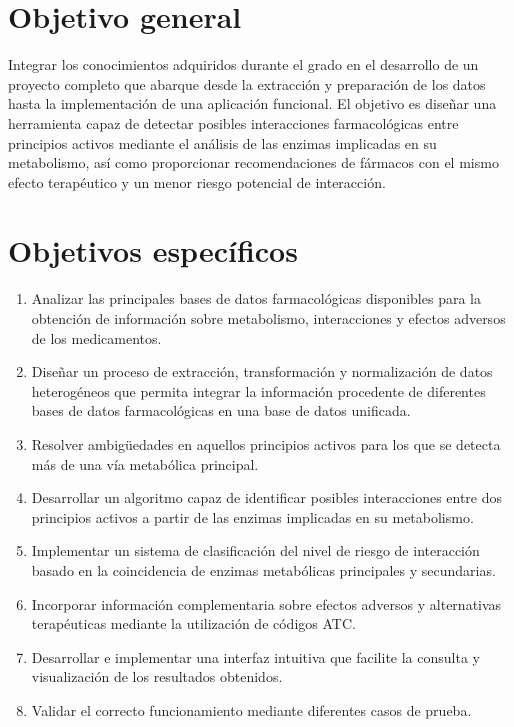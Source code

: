 
\section{Objetivo general}
Integrar los conocimientos adquiridos durante el grado en el desarrollo de un proyecto completo 
que abarque desde la extracción y preparación de los datos hasta la implementación de una  
aplicación funcional. El objetivo es diseñar una herramienta capaz de detectar posibles interacciones farmacológicas entre principios activos mediante el análisis de las enzimas implicadas en su metabolismo, así como proporcionar recomendaciones de fármacos con el mismo efecto terapéutico y un menor riesgo potencial de interacción.



\section{Objetivos específicos}
\begin{enumerate}
    \item Analizar las principales bases de datos farmacológicas disponibles para la obtención de información sobre metabolismo, interacciones y efectos adversos de los medicamentos.
    \item Diseñar un proceso de extracción, transformación y normalización de datos heterogéneos que permita integrar la información procedente de diferentes bases de datos farmacológicas en una base de datos unificada.
    \item Resolver ambigüedades en aquellos principios activos para los que se detecta más de una vía metabólica principal.
    \item Desarrollar un algoritmo capaz de identificar posibles interacciones entre dos principios activos a partir de las enzimas implicadas en su metabolismo.
    \item Implementar un sistema de clasificación del nivel de riesgo de interacción basado en la coincidencia de enzimas metabólicas principales y secundarias.
    \item Incorporar información complementaria sobre efectos adversos y alternativas terapéuticas mediante la utilización de códigos ATC.
    \item Desarrollar e implementar una interfaz intuitiva que facilite la consulta y visualización de los resultados obtenidos.
    \item Validar el correcto funcionamiento mediante diferentes casos de prueba.
\end{enumerate}

